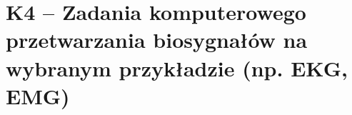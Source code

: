 \section{K4 -- Zadania komputerowego przetwarzania biosygnałów na wybranym przykładzie (np. EKG, EMG)}